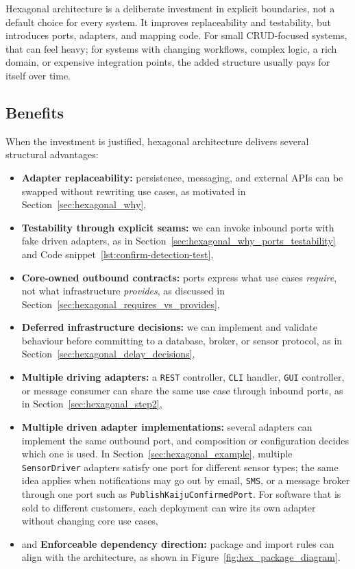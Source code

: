 Hexagonal architecture is a deliberate investment in explicit boundaries, not a default choice for every system. It improves replaceability and testability, but introduces ports, adapters, and mapping code. For small CRUD-focused systems, that can feel heavy; for systems with changing workflows, complex logic, a rich domain, or expensive integration points, the added structure usually pays for itself over time.

\subsection{Benefits}
\label{sec:hexagonal_pros}

When the investment is justified, hexagonal architecture delivers several structural advantages:
\begin{itemize}
    \item \textbf{Adapter replaceability:} persistence, messaging, and external APIs can be swapped without rewriting use cases, as motivated in Section~\ref{sec:hexagonal_why},
    \item \textbf{Testability through explicit seams:} we can invoke inbound ports with fake driven adapters, as in Section~\ref{sec:hexagonal_why_ports_testability} and Code snippet~\ref{lst:confirm-detection-test},
    \item \textbf{Core-owned outbound contracts:} ports express what use cases \textit{require}, not what infrastructure \textit{provides}, as discussed in Section~\ref{sec:hexagonal_requires_vs_provides},
    \item \textbf{Deferred infrastructure decisions:} we can implement and validate behaviour before committing to a database, broker, or sensor protocol, as in Section~\ref{sec:hexagonal_delay_decisions},
    \item \textbf{Multiple driving adapters:} a \texttt{REST} controller, \texttt{CLI} handler, \texttt{GUI} controller, or message consumer can share the same use case through inbound ports, as in Section~\ref{sec:hexagonal_step2},
    \item \textbf{Multiple driven adapter implementations:} several adapters can implement the same outbound port, and composition or configuration decides which one is used. In Section~\ref{sec:hexagonal_example}, multiple \texttt{SensorDriver} adapters satisfy one port for different sensor types; the same idea applies when notifications may go out by email, \texttt{SMS}, or a message broker through one port such as \texttt{PublishKaijuConfirmedPort}. For software that is sold to different customers, each deployment can wire its own adapter without changing core use cases,
    \item and \textbf{Enforceable dependency direction:} package and import rules can align with the architecture, as shown in Figure~\ref{fig:hex_package_diagram}.
\end{itemize}

